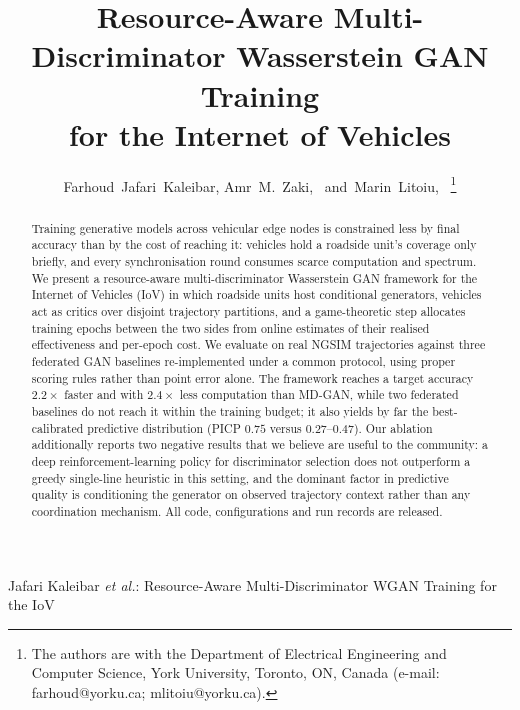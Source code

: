 \documentclass[journal]{IEEEtran}
\begin{document}
\title{Resource-Aware Multi-Discriminator Wasserstein GAN Training\\
for the Internet of Vehicles}

\author{Farhoud~Jafari~Kaleibar,
        Amr~M.~Zaki,~
        and~Marin~Litoiu,~
\thanks{The authors are with the Department of Electrical Engineering and
Computer Science, York University, Toronto, ON, Canada (e-mail:
farhoud@yorku.ca; mlitoiu@yorku.ca).}}

%
{Jafari Kaleibar \MakeLowercase{\textit{et al.}}: Resource-Aware Multi-Discriminator WGAN Training for the IoV}

\maketitle

\begin{abstract}
Training generative models across vehicular edge nodes is constrained less by
final accuracy than by the cost of reaching it: vehicles hold a roadside unit's
coverage only briefly, and every synchronisation round consumes scarce
computation and spectrum. We present a resource-aware multi-discriminator
Wasserstein GAN framework for the Internet of Vehicles (IoV) in which roadside
units host conditional generators, vehicles act as critics over disjoint
trajectory partitions, and a game-theoretic step allocates training epochs
between the two sides from online estimates of their realised effectiveness and
per-epoch cost. We evaluate on real NGSIM trajectories against three federated
GAN baselines re-implemented under a common protocol, using proper scoring
rules rather than point error alone. The framework reaches a target accuracy
$2.2\times$ faster and with $2.4\times$ less computation than MD-GAN, while two
federated baselines do not reach it within the training budget; it also yields
by far the best-calibrated predictive distribution (PICP $0.75$ versus
$0.27$--$0.47$). Our ablation additionally reports two negative results that we
believe are useful to the community: a deep reinforcement-learning policy for
discriminator selection does not outperform a greedy single-line heuristic in
this setting, and the dominant factor in predictive quality is conditioning the
generator on observed trajectory context rather than any coordination
mechanism. All code, configurations and run records are released.
\end{abstract}
\end{document}
